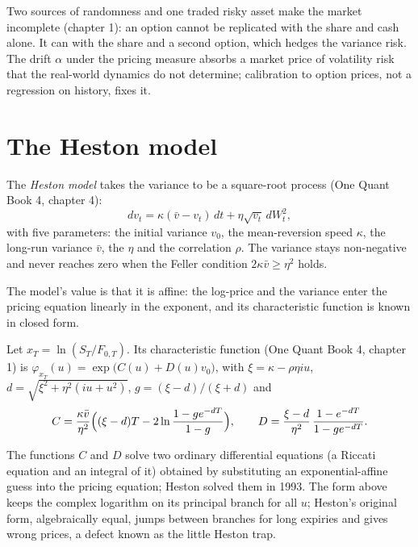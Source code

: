 Two sources of randomness and one traded risky asset make the market incomplete (chapter 1): an
option cannot be replicated with the share and cash alone. It can with the share and a second
option, which hedges the variance risk. The drift $\alpha$ under the pricing measure absorbs a
market price of volatility risk that the real-world dynamics do not determine; calibration to
option prices, not a regression on history, fixes it.

\section{The Heston model}

\begin{definition}\label{def:dv:stochastic-volatility:heston}
The \emph{Heston model} takes the variance to be a square-root process (One Quant
Book 4, chapter 4):
\[
dv_t=\kappa(\bar v-v_t)\,dt+\eta\sqrt{v_t}\,dW^2_t,
\]
with five parameters: the initial variance $v_0$, the mean-reversion speed $\kappa$, the long-run
variance $\bar v$, the  $\eta$ and the correlation $\rho$. The variance stays
non-negative and never reaches zero when the Feller condition $2\kappa\bar v\ge\eta^2$ holds.
\end{definition}

The model's value is that it is affine: the log-price and the variance enter the pricing equation
linearly in the exponent, and its characteristic function is known in closed form.

\begin{proposition}\label{prop:dv:stochastic-volatility:cf}
Let $x_T=\ln(S_T/F_{0,T})$. Its characteristic function (One Quant Book 4, chapter 1) is
$\varphi_{x_T}(u)=\exp\bigl(C(u)+D(u)v_0\bigr)$, with $\xi=\kappa-\rho\eta iu$,
$d=\sqrt{\xi^2+\eta^2(iu+u^2)}$, $g=(\xi-d)/(\xi+d)$ and
\[
C=\frac{\kappa\bar v}{\eta^2}\Bigl((\xi-d)T-2\ln\frac{1-ge^{-dT}}{1-g}\Bigr),\qquad
D=\frac{\xi-d}{\eta^2}\,\frac{1-e^{-dT}}{1-ge^{-dT}} .
\]
\end{proposition}
\admitted

The functions $C$ and $D$ solve two ordinary differential equations (a Riccati equation and an
integral of it) obtained by substituting an exponential-affine guess into the pricing equation;
Heston solved them in 1993. The form above keeps the complex logarithm on its principal branch for
all $u$; Heston's original form, algebraically equal, jumps between branches for long expiries and
gives wrong prices, a defect known as the little Heston trap.

